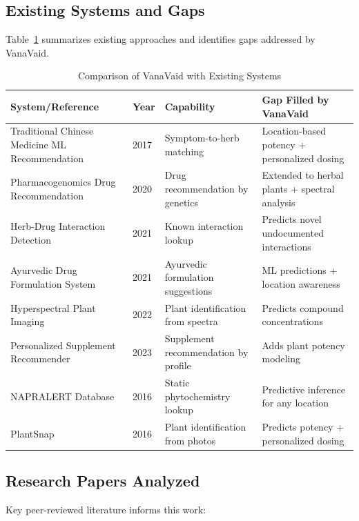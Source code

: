 \documentclass[11pt,a4paper]{article}
\begin{document}
\subsection{Existing Systems and Gaps}

Table~\ref{tab:existing_systems} summarizes existing approaches and identifies gaps addressed by VanaVaid.

\begin{table}[H]
\centering
\caption{Comparison of VanaVaid with Existing Systems}
\label{tab:existing_systems}
\small
\begin{tabular}{|l|l|l|l|}
\hline
\textbf{System/Reference} & \textbf{Year} & \textbf{Capability} & \textbf{Gap Filled by VanaVaid} \\
\hline
Traditional Chinese Medicine ML Recommendation & 2017 & Symptom-to-herb matching & Location-based potency + personalized dosing \\
\hline
Pharmacogenomics Drug Recommendation & 2020 & Drug recommendation by genetics & Extended to herbal plants + spectral analysis \\
\hline
Herb-Drug Interaction Detection & 2021 & Known interaction lookup & Predicts novel undocumented interactions \\
\hline
Ayurvedic Drug Formulation System & 2021 & Ayurvedic formulation suggestions & ML predictions + location awareness \\
\hline
Hyperspectral Plant Imaging & 2022 & Plant identification from spectra & Predicts compound concentrations \\
\hline
Personalized Supplement Recommender & 2023 & Supplement recommendation by profile & Adds plant potency modeling \\
\hline
NAPRALERT Database & 2016 & Static phytochemistry lookup & Predictive inference for any location \\
\hline
PlantSnap & 2016 & Plant identification from photos & Predicts potency + personalized dosing \\
\hline
\end{tabular}
\end{table}

\subsection{Research Papers Analyzed}

Key peer-reviewed literature informs this work:
\end{document}
